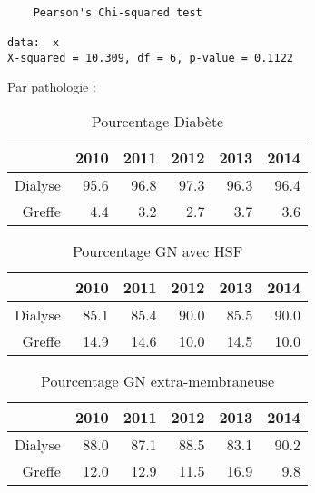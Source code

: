 \documentclass[11pt,a4paper]{article}\usepackage[]{graphicx}\usepackage[]{color}
\makeatletter
\newenvironment{kframe}{%
 \def\at@end@of@kframe{}%
 \ifinner\ifhmode%
  \def\at@end@of@kframe{\end{minipage}}%
  \begin{minipage}{\columnwidth}%
 \fi\fi%
 \def\FrameCommand##1{\hskip\@totalleftmargin \hskip-\fboxsep
 \colorbox{shadecolor}{##1}\hskip-\fboxsep
     \hskip-\linewidth \hskip-\@totalleftmargin \hskip\columnwidth}%
 \MakeFramed {\advance\hsize-\width
   \@totalleftmargin\z@ \linewidth\hsize
   \@setminipage}}%
 {\par\unskip\endMakeFramed%
 \at@end@of@kframe}
\newenvironment{knitrout}{}{} %
\makeatother
\begin{document}
\begin{knitrout}
\color{fgcolor}\begin{kframe}
\begin{verbatim}

	Pearson's Chi-squared test

data:  x
X-squared = 10.309, df = 6, p-value = 0.1122
\end{verbatim}
\end{kframe}
\end{knitrout}


Par pathologie :

\begin{table}[H]
\centering
\begin{tabular}{rrrrrr}
  \hline
 & 2010 & 2011 & 2012 & 2013 & 2014 \\ 
  \hline
Dialyse & 95.6 & 96.8 & 97.3 & 96.3 & 96.4 \\ 
  Greffe & 4.4 & 3.2 & 2.7 & 3.7 & 3.6 \\ 
   \hline
\end{tabular}
\caption{Pourcentage Diabète} 
\end{table}
\begin{table}[H]
\centering
\begin{tabular}{rrrrrr}
  \hline
 & 2010 & 2011 & 2012 & 2013 & 2014 \\ 
  \hline
Dialyse & 85.1 & 85.4 & 90.0 & 85.5 & 90.0 \\ 
  Greffe & 14.9 & 14.6 & 10.0 & 14.5 & 10.0 \\ 
   \hline
\end{tabular}
\caption{Pourcentage GN avec HSF} 
\end{table}
\begin{table}[H]
\centering
\begin{tabular}{rrrrrr}
  \hline
 & 2010 & 2011 & 2012 & 2013 & 2014 \\ 
  \hline
Dialyse & 88.0 & 87.1 & 88.5 & 83.1 & 90.2 \\ 
  Greffe & 12.0 & 12.9 & 11.5 & 16.9 & 9.8 \\ 
   \hline
\end{tabular}
\caption{Pourcentage GN extra-membraneuse} 
\end{table}
\end{document}
